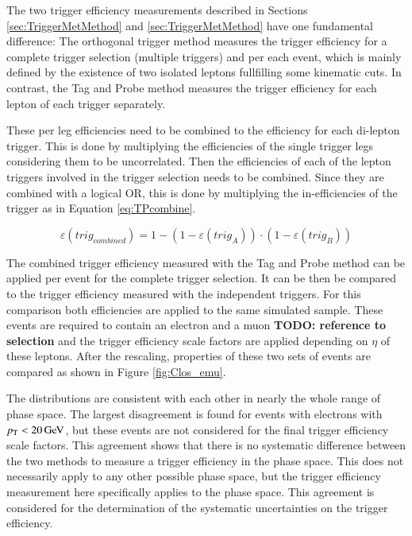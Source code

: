 The two trigger efficiency measurements described in Sections \ref{sec:TriggerMetMethod} and \ref{sec:TriggerMetMethod} have one fundamental difference: The orthogonal trigger method measures the trigger efficiency for a complete trigger selection (multiple triggers) and per each event, which is mainly defined by the existence of two isolated leptons fullfilling some kinematic cuts. In contrast, the Tag and Probe method measures the trigger efficiency for each lepton of each trigger separately. 

These per leg efficiencies need to be combined to the efficiency for each di-lepton trigger. This is done by multiplying the efficiencies of the single trigger legs considering them to be uncorrelated. 
Then the efficiencies of each of the lepton triggers involved in the trigger selection needs to be combined. Since they are combined with a logical OR, this is done by multiplying the in-efficiencies of the trigger as in Equation \ref{eq:TPcombine}.

\begin{equation}
\varepsilon(trig_{combined}) = 1- (1-\varepsilon(trig_A))\cdot(1- \varepsilon(trig_B))
\label{eq:TPcombine}
\end{equation}

The combined trigger efficiency measured with the Tag and Probe method can be applied per event for the complete trigger selection. It can be then be compared to the trigger efficiency measured with the independent triggers.
For this comparison both efficiencies are applied to the same simulated \ttbar sample. These \ttbar events are required to contain an electron and a muon \textbf{TODO: reference to selection} and the trigger efficiency scale factors are applied depending on $\eta$ of these leptons.
After the rescaling, properties of these two sets of \ttbar events are compared as shown in Figure \ref{fig:Clos_emu}.

The distributions are consistent with each other in nearly the whole range of phase space. The largest disagreement is found for events with electrons with $p_{\mathrm{T}}<20\,\text{Ge\hspace{-.08em}V}$, but these events are not considered for the final trigger efficiency scale factors. This agreement shows that there is no systematic difference between the two methods to measure a trigger efficiency in the \ttbar phase space. This does not necessarily apply to any other possible phase space, but the trigger efficiency measurement here specifically applies to the \ttbar phase space. This agreement is considered for the determination of the systematic uncertainties on the trigger efficiency.

